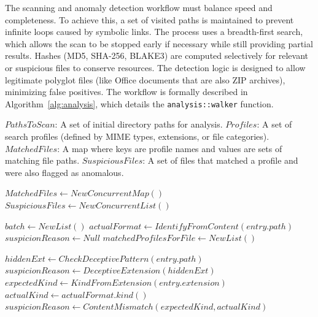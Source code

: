 \documentclass[preprint,12pt,a4paper]{elsarticle}
\begin{document}
The scanning and anomaly detection workflow must balance speed and completeness. To achieve this, a set of visited paths is maintained to prevent infinite loops caused by symbolic links. The process uses a breadth-first search, which allows the scan to be stopped early if necessary while still providing partial results. Hashes (MD5, SHA-256, BLAKE3) are computed selectively for relevant or suspicious files to conserve resources. The detection logic is designed to allow legitimate polyglot files (like Office documents that are also ZIP archives), minimizing false positives. The workflow is formally described in Algorithm~\ref{alg:analysis}, which details the \texttt{analysis::walker} function.

\begin{algorithm}[htb]
\scriptsize
\caption{Live File System Triage and Anomaly Detection}
\label{alg:analysis}
\begin{algorithmic}[1]
\Require $PathsToScan$: A set of initial directory paths for analysis.
\Require $Profiles$: A set of search profiles (defined by MIME types, extensions, or file categories).
\Ensure $MatchedFiles$: A map where keys are profile names and values are sets of matching file paths.
\Ensure $SuspiciousFiles$: A set of files that matched a profile and were also flagged as anomalous.

\State $MatchedFiles \gets NewConcurrentMap()$
\State $SuspiciousFiles \gets NewConcurrentList()$

    \State $batch \gets NewList()$
            \State $actualFormat \gets IdentifyFromContent(entry.path)$ 
            \State $suspicionReason \gets Null$
            \State $matchedProfilesForFile \gets NewList()$

            \Statex {}
            \State $hiddenExt \gets CheckDeceptivePattern(entry.path)$ 
                \State $suspicionReason \gets DeceptiveExtension(hiddenExt)$
            \Else
                \State $expectedKind \gets KindFromExtension(entry.extension)$
                \State $actualKind \gets actualFormat.kind()$
                    \State $suspicionReason \gets ContentMismatch(expectedKind, actualKind)$
                \EndIf
            \EndIf


\end{algorithmic}
\end{algorithm}
\end{document}

